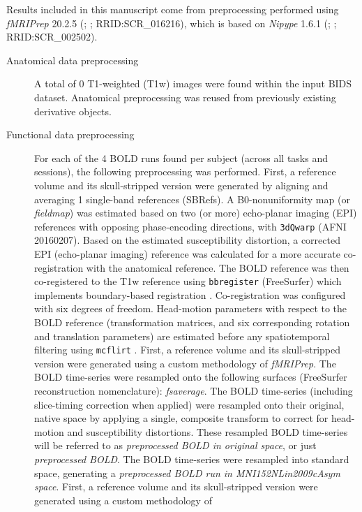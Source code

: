 \documentclass[]{article}
\date{}
\begin{document}
Results included in this manuscript come from preprocessing performed
using \emph{fMRIPrep} 20.2.5 (\citet{fmriprep1}; \citet{fmriprep2};
RRID:SCR\_016216), which is based on \emph{Nipype} 1.6.1
(\citet{nipype1}; \citet{nipype2}; RRID:SCR\_002502).

\begin{description}
\item[Anatomical data preprocessing]
A total of 0 T1-weighted (T1w) images were found within the input BIDS
dataset. Anatomical preprocessing was reused from previously existing
derivative objects.
\item[Functional data preprocessing]
For each of the 4 BOLD runs found per subject (across all tasks and
sessions), the following preprocessing was performed. First, a reference
volume and its skull-stripped version were generated by aligning and
averaging 1 single-band references (SBRefs). A B0-nonuniformity map (or
\emph{fieldmap}) was estimated based on two (or more) echo-planar
imaging (EPI) references with opposing phase-encoding directions, with
\texttt{3dQwarp} \citet{afni} (AFNI 20160207). Based on the estimated
susceptibility distortion, a corrected EPI (echo-planar imaging)
reference was calculated for a more accurate co-registration with the
anatomical reference. The BOLD reference was then co-registered to the
T1w reference using \texttt{bbregister} (FreeSurfer) which implements
boundary-based registration \citep{bbr}. Co-registration was configured
with six degrees of freedom. Head-motion parameters with respect to the
BOLD reference (transformation matrices, and six corresponding rotation
and translation parameters) are estimated before any spatiotemporal
filtering using \texttt{mcflirt} \citep[FSL 5.0.9,][]{mcflirt}. First, a
reference volume and its skull-stripped version were generated using a
custom methodology of \emph{fMRIPrep}. The BOLD time-series were
resampled onto the following surfaces (FreeSurfer reconstruction
nomenclature): \emph{fsaverage}. The BOLD time-series (including
slice-timing correction when applied) were resampled onto their
original, native space by applying a single, composite transform to
correct for head-motion and susceptibility distortions. These resampled
BOLD time-series will be referred to as \emph{preprocessed BOLD in
original space}, or just \emph{preprocessed BOLD}. The BOLD time-series
were resampled into standard space, generating a \emph{preprocessed BOLD
run in MNI152NLin2009cAsym space}. First, a reference volume and its
skull-stripped version were generated using a custom methodology of

\end{description}
\end{document}
